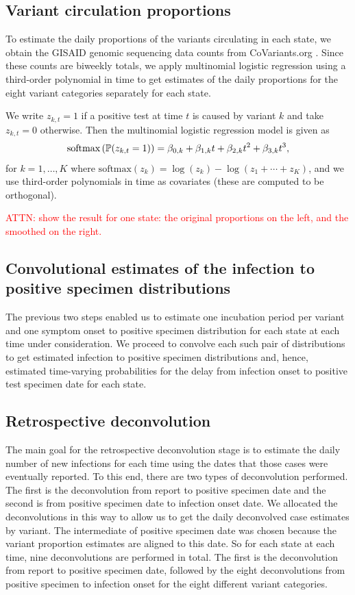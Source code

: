 \documentclass{article}
\newcommand{\attn }[1]{\textcolor{red}{ATTN: #1}}
\begin{document}
\subsection{Variant circulation proportions}

To estimate the daily proportions of the variants circulating in each state, we
obtain the GISAID genomic sequencing data counts from CoVariants.org
\citep{hodcroft2021covariants, elbe2017data}. Since these counts are biweekly totals, we
apply multinomial logistic regression using a third-order polynomial in time to
get estimates of the daily proportions for the eight variant categories
separately for each state.

We write $z_{k,t} = 1$ if a positive test at time $t$ is caused by
variant $k$ and take $z_{k,t} = 0$ otherwise. Then the multinomial logistic
regression model is given as
$$
\textrm{softmax}\left(\P(z_{k,t} = 1)\right) = \beta_{0,k} + 
\beta_{1,k} t + \beta_{2,k} t^2 + \beta_{3,k} t^3,
$$
for $k = 1,\ldots,K$ where $\textrm{softmax}(z_k) = \log(z_k) - \log(z_1 +
\cdots + z_K)$, and we use third-order polynomials in time as covariates (these
are computed to be orthogonal). 

\attn{show the result for one
state: the original proportions on the left, and the smoothed on the
right.}


\subsection{Convolutional estimates of the infection to positive specimen distributions} 

The previous two steps enabled us to estimate one incubation period per variant
and one symptom onset to positive specimen distribution for each state at each
time under consideration. We proceed to convolve each such pair of distributions
to get estimated infection to positive specimen distributions and, hence,
estimated time-varying probabilities for the delay from infection onset to
positive test specimen date for each state.

\subsection{Retrospective deconvolution}

The main goal for the retrospective deconvolution stage is to estimate the daily
number of new infections for each time using the dates that those cases were
eventually reported. To this end, there are two types of deconvolution
performed. The first is the deconvolution from report to positive specimen date
and the second is from positive specimen date to infection onset date. We
allocated the deconvolutions in this way to allow us to get the daily
deconvolved case estimates by variant. The intermediate of positive specimen
date was chosen because the variant proportion estimates are aligned to this
date. So for each state at each time, nine deconvolutions are performed in
total. The first is the deconvolution from report to positive specimen date,
followed by the eight deconvolutions from positive specimen to infection onset
for the eight different variant categories.
\end{document}
